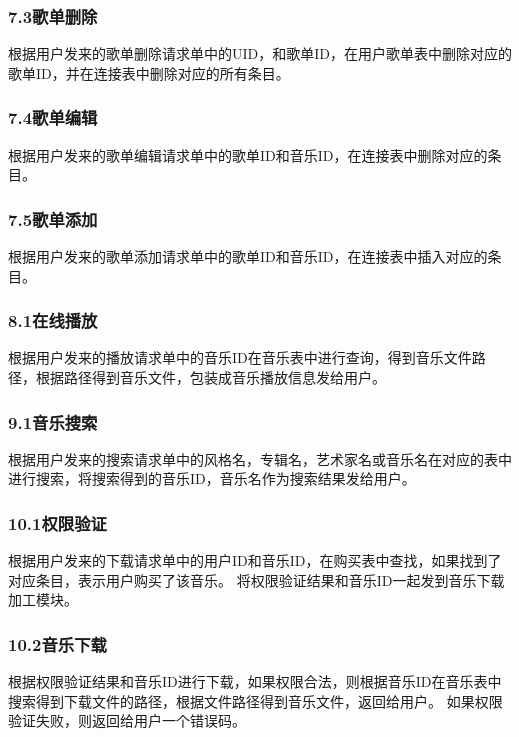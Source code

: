 \subsubsection{7.3歌单删除}

根据用户发来的歌单删除请求单中的UID，和歌单ID，在用户歌单表中删除对应的歌单ID，并在连接表中删除对应的所有条目。

\subsubsection{7.4歌单编辑}

根据用户发来的歌单编辑请求单中的歌单ID和音乐ID，在连接表中删除对应的条目。

\subsubsection{7.5歌单添加}

根据用户发来的歌单添加请求单中的歌单ID和音乐ID，在连接表中插入对应的条目。

\subsubsection{8.1在线播放}

根据用户发来的播放请求单中的音乐ID在音乐表中进行查询，得到音乐文件路径，根据路径得到音乐文件，包装成音乐播放信息发给用户。

\subsubsection{9.1音乐搜索}

根据用户发来的搜索请求单中的风格名，专辑名，艺术家名或音乐名在对应的表中进行搜索，将搜索得到的音乐ID，音乐名作为搜索结果发给用户。

\subsubsection{10.1权限验证}

根据用户发来的下载请求单中的用户ID和音乐ID，在购买表中查找，如果找到了对应条目，表示用户购买了该音乐。
将权限验证结果和音乐ID一起发到音乐下载加工模块。

\subsubsection{10.2音乐下载}
根据权限验证结果和音乐ID进行下载，如果权限合法，则根据音乐ID在音乐表中搜索得到下载文件的路径，根据文件路径得到音乐文件，返回给用户。
如果权限验证失败，则返回给用户一个错误码。

